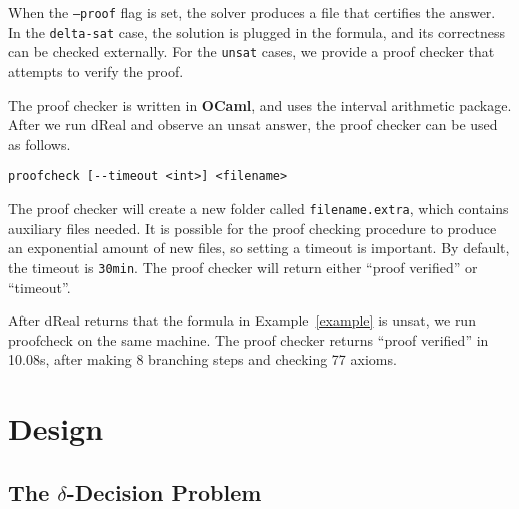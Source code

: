 \documentclass[envcountsect]{llncs}
\begin{document}
When the {\tt --proof} flag is set, the solver produces a file that certifies
the answer. In the {\tt delta-sat} case, the solution is plugged in the
formula, and its correctness can be checked externally. For the {\tt unsat}
cases, we provide a proof checker that attempts to verify the proof.

The proof checker is written in {\bf OCaml}, and uses the interval arithmetic
package. After we run {\sf dReal} and observe an {\sf unsat} answer,
the proof checker can be used as follows.
\begin{verbatim}
proofcheck [--timeout <int>] <filename>
\end{verbatim}
The proof checker will create a new folder called {\tt filename.extra}, which
contains auxiliary files needed. It is possible for the proof
checking procedure to produce an exponential amount of new files, so setting a
 timeout is important. By default, the timeout is {\tt 30min}. The proof
checker will return either ``{\sf proof verified}'' or ``{\sf timeout}''.

\begin{example}
After {\sf dReal} returns that the formula in Example~\ref{example} is {\sf
unsat}, we run {\sf proofcheck} on the same machine. The proof checker returns
``{\sf proof verified}'' in 10.08s, after making 8 branching steps and
checking 77 axioms.
\end{example}

\section{Design}

\subsection{The $\delta$-Decision Problem}\label{lbl:deltas}
\end{document}
